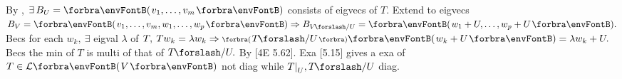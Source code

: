 
By , $\exists\,B_U=\Par{v_1,\dots,v_m}$ consists of eigvecs of $T.$\parSol{}
Extend to eigvecs $B_V=\Par{v_1,\dots,v_m,w_1,\dots,w_p}\Rightarrow B_{V\XSlash U}=\Par{w_1+U,\dots,w_p+U}.$\parSol{}
Becs for each $w_k,\:\exists$ eigval $\lambda$ of $T,\:Tw_k=\lambda w_k\Rightarrow\BigPar{T\XSlash U}\Par{w_k+U}=\lambda w_k+U.$\PfEnd\vspace{2pt}\parSol{}
\Or Becs the min of $T$ is multi of that of $T\XSlash U.$ By [4E 5.62].\PfEnd\vspace{2pt}
\AComm Exa [5.15] gives a exa of $T\in\Lm{V}$ not diag while $T\mmid_U,T\XSlash U$ diag.\PfEnd
\SepLine



\ChEnd

